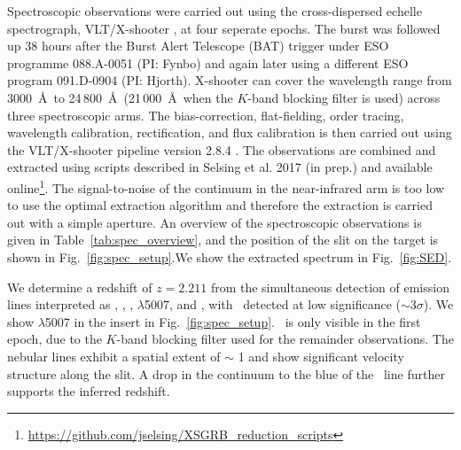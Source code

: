 \documentclass{aa}    %
\begin{document}
Spectroscopic observations were carried out using the cross-dispersed echelle
spectrograph, VLT/X-shooter \citep{Vernet2011}, at four seperate epochs. The
burst was followed up 38 hours after the Burst Alert Telescope (BAT) trigger
under ESO programme 088.A-0051 (PI: Fynbo) and again later using a different ESO
program 091.D-0904 (PI: Hjorth). X-shooter can cover the wavelength range from
3000~\AA~to 24\,800~\AA~(21\,000~\AA~when the $K$-band blocking filter is used)
across three spectroscopic arms. The bias-correction, flat-fielding, order
tracing, wavelength calibration, rectification, and flux calibration is then
carried out using the VLT/X-shooter pipeline version 2.8.4
\citep{Modigliani2010}. %
The observations are combined and extracted using scripts described in Selsing
et al. 2017 (in prep.) and available
online\footnote{\url{https://github.com/jselsing/XSGRB_reduction_scripts}}. The
signal-to-noise of the continuum in the near-infrared arm is too low to use the
optimal extraction algorithm \citep{Horne1986} and therefore the extraction is
carried out with a simple aperture. An overview of the spectroscopic
observations is given in Table~\ref{tab:spec_overview}, and the position of the
slit on the target is shown in Fig.~\ref{fig:spec_setup}.We show the extracted
spectrum in Fig.~\ref{fig:SED}.

We determine a redshift of $z = 2.211$ from the simultaneous detection of
emission lines interpreted as \lya, \oii, \hb, \oiii$\lambda$5007, and \ha, with
\hb~detected at low significance ($\sim 3 \sigma$). We show \oiii$\lambda$5007
in the insert in Fig.~\ref{fig:spec_setup}.  \ha~is only visible in the first
epoch, due to the $K$-band blocking filter used for the remainder observations.
The nebular lines exhibit a spatial extent of $\sim$ 1 and show
significant velocity structure along the slit. A drop in the continuum to the
blue of the \lya~line further supports the inferred redshift.

\end{document}
